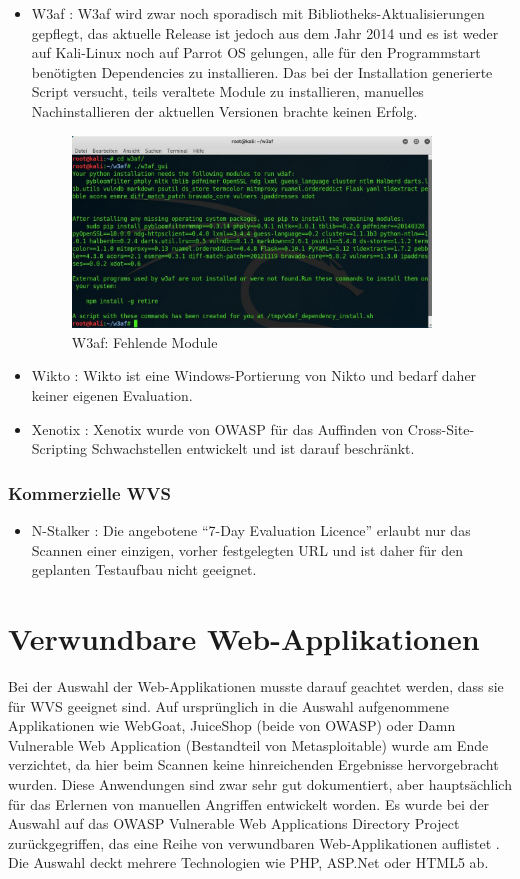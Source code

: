 \documentclass[12pt,oneside,a4paper,parskip,pointlessnumbers]{scrbook}
\begin{document}
\begin{itemize}
      \item W3af \cite{W3af}: W3af wird zwar noch sporadisch mit Bibliotheks-Aktualisierungen gepflegt, das aktuelle Release ist jedoch aus dem Jahr 2014 und es ist weder auf Kali-Linux noch auf Parrot OS gelungen, alle für den Programmstart benötigten Dependencies zu installieren. Das bei der Installation generierte Script versucht, teils veraltete Module zu installieren, manuelles Nachinstallieren der aktuellen Versionen brachte keinen Erfolg.
      \begin{figure}[H]
        \centering
        \includegraphics[width=0.9\textwidth]{Images/w3af}
        \caption[W3af: Fehlende Module]{W3af: Fehlende Module}
      \end{figure}
      \item Wikto \cite{Wikto}: Wikto ist eine Windows-Portierung von Nikto und bedarf daher keiner eigenen Evaluation.
      \item Xenotix \cite{Xenotix}: Xenotix wurde von OWASP für das Auffinden von Cross-Site-Scripting Schwachstellen entwickelt und ist darauf beschränkt.
    \end{itemize}
    \subsubsection{Kommerzielle WVS}
      \begin{itemize}
        \item N-Stalker \cite{Stalker}: Die angebotene ``7-Day Evaluation Licence'' erlaubt nur das Scannen einer einzigen, vorher festgelegten URL und ist daher für den geplanten Testaufbau nicht geeignet.
      \end{itemize}
\newpage
\section{Verwundbare Web-Applikationen}
  Bei der Auswahl der Web-Applikationen musste darauf geachtet werden, dass sie für WVS geeignet sind. Auf ursprünglich in die Auswahl aufgenommene Applikationen wie WebGoat, JuiceShop (beide von OWASP) oder Damn Vulnerable Web Application (Bestandteil von Metasploitable) wurde am Ende verzichtet, da hier beim Scannen keine hinreichenden Ergebnisse hervorgebracht wurden. Diese Anwendungen  sind zwar sehr gut dokumentiert, aber hauptsächlich für das Erlernen von manuellen Angriffen entwickelt worden. Es wurde bei der Auswahl auf das OWASP Vulnerable Web Applications Directory Project zurückgegriffen, das eine Reihe von verwundbaren Web-Applikationen auflistet \cite{OWASPWebApps}. Die Auswahl deckt mehrere Technologien wie PHP, ASP.Net oder HTML5 ab.
\end{document}
